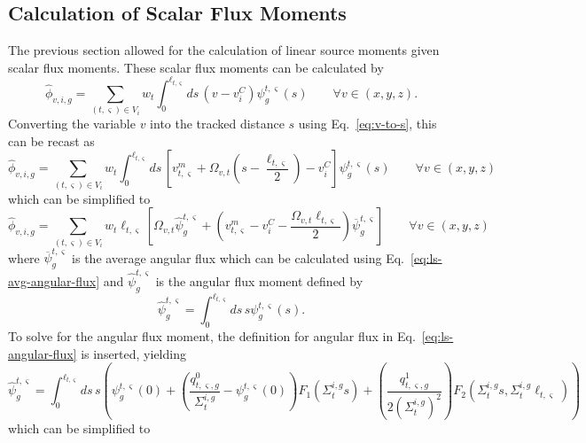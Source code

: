 \subsection{Calculation of Scalar Flux Moments}
\label{sec:ls-moments}
The previous section allowed for the calculation of linear source moments given scalar flux moments. These scalar flux moments can be calculated by
\begin{equation}
\hat{\phi}_{v,i,g} = \sum_{(t,\varsigma) \in V_i} w_t \int_{0}^{\ell_{t,\varsigma}} ds \, \left(v - v^C_i\right) \psi^{t,\varsigma}_g(s) \qquad \forall v \in (x,y,z).
\end{equation}
Converting the variable $v$ into the tracked distance $s$ using Eq.~\ref{eq:v-to-s}, this can be recast as
\begin{equation}
\hat{\phi}_{v,i,g} = \sum_{(t,\varsigma) \in V_i} w_t \int_{0}^{\ell_{t,\varsigma}} ds \, \left[v^m_{t,\varsigma} + \Omega_{v,t} \left(s - \frac{\ell_{t,\varsigma}}{2} \right) - v^C_i \right] \psi^{t,\varsigma}_g(s) \qquad \forall v \in (x,y,z)
\end{equation}
which can be simplified to
\begin{equation}
\hat{\phi}_{v,i,g} = \sum_{(t,\varsigma) \in V_i} w_t \ell_{t,\varsigma} \left[\Omega_{v,t} \hat{\psi}^{t,\varsigma}_g +  \left( v^m_{t,\varsigma}- v^C_i - \frac{\Omega_{v,t} \ell_{t,\varsigma}}{2} \right) \overline{\psi}^{t,\varsigma}_g \right] \qquad \forall v \in (x,y,z)
\label{eq:flux-moments-1}
\end{equation}
where $\overline{\psi}^{t,\varsigma}_g$ is the average angular flux which can be calculated using Eq.~\ref{eq:ls-avg-angular-flux} and $ \hat{\psi}^{t,\varsigma}_g$ is the angular flux moment defined by
\begin{equation}
 \hat{\psi}^{t,\varsigma}_g = \int_{0}^{\ell_{t,\varsigma}} ds \, s \psi^{t,\varsigma}_g(s).
\end{equation}
To solve for the angular flux moment, the definition for angular flux in Eq.~\ref{eq:ls-angular-flux} is inserted, yielding
\begin{equation}
\hat{\psi}^{t,\varsigma}_g = \int_{0}^{\ell_{t,\varsigma}} ds \, s \left(\psi^{t,\varsigma}_g(0) + \left( \frac{q^0_{t,\varsigma,g}}{\Sigma_{t}^{i,g}} - \psi_g^{t,\varsigma}(0) \right) F_1\left(\Sigma_{t}^{i,g} s \right) + \left(\frac{q^1_{t,\varsigma,g}}{2\left(\Sigma_{t}^{i,g}\right)^2}\right) F_2\left(\Sigma_{t}^{i,g} s, \Sigma_{t}^{i,g} \ell_{t,\varsigma} \right)\right)
\end{equation}
which can be simplified to
